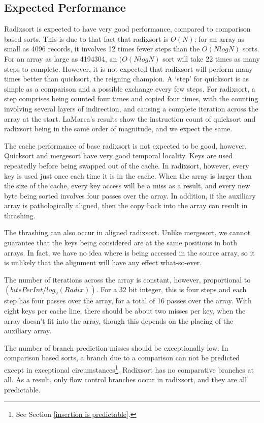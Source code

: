 \subsection{Expected Performance}
Radixsort is expected to have very good performance, compared to comparison
based sorts. This is due to that fact that radixsort is $O(N)$; for an array as
small as 4096 records, it involves 12 times fewer steps than the $O(NlogN)$
sorts. For an array as large as 4194304, an $(O(NlogN)$ sort will take 22 times
as many steps to complete. However, it is not expected that radixsort will
perform many times better than quicksort, the reigning champion. A `step' for
quicksort is as simple as a comparison and a possible exchange every few steps.
For radixsort, a step comprises being counted four times and copied four times,
with the counting involving several layers of indirection, and causing a
complete iteration across the array at the start. LaMarca's results
show the instruction count of quicksort and radixsort being in the same order of
magnitude, and we expect the same.

The cache performance of base radixsort is not expected to be good, however.
Quicksort and mergesort have very good temporal locality. Keys are
used repeatedly before being swapped out of the cache. In radixsort, however,
every key is used just once each time it is in the cache. When the array is larger than
the size of the cache, every key access will be a miss as a result, and every
new byte being sorted involves four passes over the array. In addition, if the
auxiliary array is pathologically aligned, then the copy back into the array
can result in thrashing.

The thrashing can also occur in aligned radixsort. Unlike mergesort, we cannot
guarantee that the keys being considered are at the same positions in both
arrays. In fact, we have no idea where is being accessed in the source array, so
it is unlikely that the alignment will have any effect what-so-ever.

The number of iterations across the array is constant, however, proportional to
$(bitsPerInt/log_2(Radix))$. For a 32 bit integer, this is four steps and each step
has four passes over the array, for a total of 16 passes over the array.  With
eight keys per cache line, there should be about two misses per key, when the
array doesn't fit into the array, though this depends on the placing of the
auxiliary array.

The number of branch prediction misses should be exceptionally low. In
comparison based sorts, a branch due to a comparison can not be predicted except
in exceptional circumstances\footnote{See Section \ref{insertion is
predictable}.}. Radixsort has no comparative branches at all. As a result, only
flow control branches occur in radixsort, and they are all predictable.

